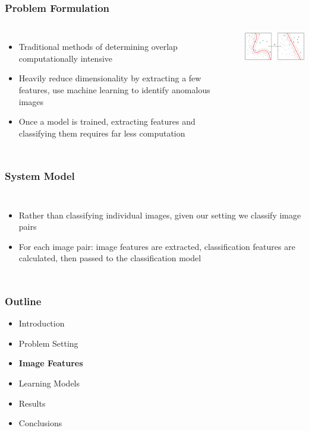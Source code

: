 \documentclass{beamer}
\begin{document}
\begin{frame}
\frametitle{Problem Formulation}
\begin{columns}
  \begin{itemize}
    \item Traditional methods of determining overlap computationally intensive
    \item Heavily reduce dimensionality by extracting a few features, use machine learning to identify anomalous images
    \item Once a model is trained, extracting features and classifying them requires far less computation
  \end{itemize}
  \includegraphics[width = 5cm]{Figures/machinelearning}
\end{columns}
\end{frame}


\begin{frame}
\frametitle{System Model}
\begin{columns}
  \scalebox{0.7}{}
  \begin{itemize}
    \item Rather than classifying individual images, given our setting we classify image pairs
    \item For each image pair: image features are extracted, classification features are calculated, then passed to the classification model
  \end{itemize}
\end{columns}
\end{frame}


\begin{frame}
\frametitle{Outline}
\begin{itemize}
  \item Introduction
  \item\vspace{0.5cm}Problem Setting
  \item\vspace{0.5cm} \textbf{Image Features}
  \item \vspace{0.5cm}Learning Models
  \item \vspace{0.5cm} Results
  \item \vspace{0.5cm}Conclusions
\end{itemize}
\end{frame}
\end{document}
